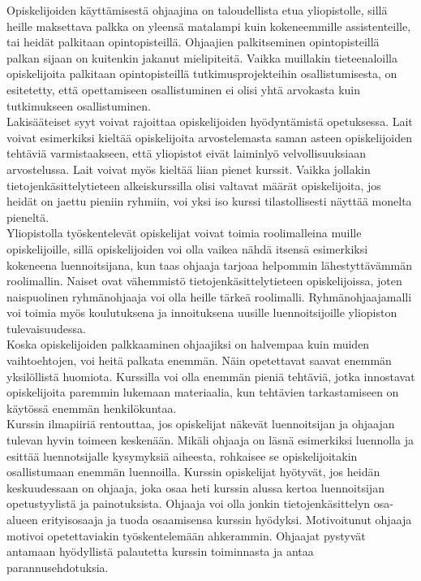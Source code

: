 \documentclass[finnish]{tktltiki2}
\theoremstyle{definition}
\theoremstyle{remark}
\begin{document}
Opiskelijoiden käyttämisestä ohjaajina on taloudellista etua yliopistolle, sillä heille maksettava palkka on yleensä matalampi kuin kokeneemmille assistenteille, tai heidät palkitaan opintopisteillä. Ohjaajien palkitseminen opintopisteillä palkan sijaan on kuitenkin jakanut mielipiteitä. Vaikka muillakin tieteenaloilla opiskelijoita palkitaan opintopisteillä tutkimusprojekteihin osallistumisesta, on esitetetty, että opettamiseen osallistuminen ei olisi yhtä arvokasta kuin tutkimukseen osallistuminen.\cite{Reges88}
\\
Lakisääteiset syyt voivat rajoittaa opiskelijoiden hyödyntämistä opetuksessa. Lait voivat esimerkiksi kieltää opiskelijoita arvostelemasta saman asteen opiskelijoiden tehtäviä varmistaakseen, että yliopistot eivät laiminlyö velvollisuuksiaan arvostelussa. Lait voivat myös kieltää liian pienet kurssit. Vaikka jollakin tietojenkäsittelytieteen alkeiskurssilla olisi valtavat määrät opiskelijoita, jos heidät on jaettu pieniin ryhmiin, voi yksi iso kurssi tilastollisesti näyttää monelta pieneltä.\cite{Reges03}
\\
Yliopistolla työskentelevät opiskelijat voivat toimia roolimalleina muille opiskelijoille\cite{Roberts95, Tashakkori05}, sillä opiskelijoiden voi olla vaikea nähdä itsensä esimerkiksi kokeneena luennoitsijana, kun taas ohjaaja tarjoaa helpommin lähestyttävämmän roolimallin.\cite{Roberts02} Naiset ovat vähemmistö tietojenkäsittelytieteen opiskelijoissa, joten naispuolinen ryhmänohjaaja voi olla heille tärkeä roolimalli. \cite{Roberts95} Ryhmänohjaajamalli voi toimia myös koulutuksena ja innoituksena uusille luennoitsijoille yliopiston tulevaisuudessa.\cite{Roberts95}
\\
Koska opiskelijoiden palkkaaminen ohjaajiksi on halvempaa kuin muiden vaihtoehtojen, voi heitä palkata enemmän. Näin opetettavat saavat enemmän yksilöllistä huomiota. Kurssilla voi olla enemmän pieniä tehtäviä, jotka innostavat opiskelijoita paremmin lukemaan materiaalia, kun tehtävien tarkastamiseen on käytössä enemmän henkilökuntaa.\cite{Dickson11}
\\
Kurssin ilmapiiriä rentouttaa, jos opiskelijat näkevät luennoitsijan ja ohjaajan tulevan hyvin toimeen keskenään. Mikäli ohjaaja on läsnä esimerkiksi luennolla ja esittää luennotsijalle kysymyksiä aiheesta, rohkaisee se opiskelijoitakin osallistumaan enemmän luennoilla. Kurssin opiskelijat hyötyvät, jos heidän keskuudessaan on ohjaaja, joka osaa heti kurssin alussa kertoa luennoitsijan opetustyylistä ja painotuksista. Ohjaaja voi olla jonkin tietojenkäsittelyn osa-alueen erityisosaaja ja tuoda osaamisensa kurssin hyödyksi. Motivoitunut ohjaaja motivoi opetettaviakin työskentelemään ahkerammin.\cite{Dickson11} Ohjaajat pystyvät antamaan hyödyllistä palautetta kurssin toiminnasta ja antaa parannusehdotuksia.\cite{Decker06}
\end{document}
